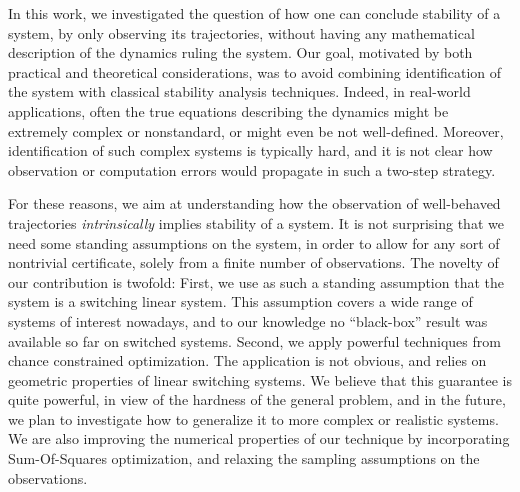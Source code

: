 In this work, we investigated the question of how one can conclude stability of a system, by only observing its trajectories, without having any mathematical description of the dynamics ruling the system. Our goal, motivated by both practical and theoretical considerations, was to avoid combining identification of the system with classical stability analysis techniques. Indeed, in real-world applications, often the true equations describing the dynamics might be extremely complex or nonstandard, or might even be not well-defined. Moreover, identification of such complex systems is typically hard, and it is not clear how observation or computation errors would propagate in such a two-step strategy. 

For these reasons, we aim at understanding how the observation of well-behaved trajectories \emph{intrinsically} implies stability of a system. It is not surprising that we need some standing assumptions on the system, in order to allow for any sort of nontrivial certificate, solely from a finite number of observations. The novelty of our contribution is twofold: 
First, we use as such a standing assumption that the system is a switching linear system. This assumption covers a wide range of systems of interest nowadays, and to our knowledge no ``black-box'' result was available so far on switched systems.  
Second, we apply powerful techniques from chance constrained optimization. The application is not obvious, and relies on geometric properties of linear switching systems. We believe that this guarantee is quite powerful, in view of the hardness of the general problem, and in the future, we plan to investigate how to generalize it to more complex or realistic systems. We are also improving the numerical properties of our technique by incorporating Sum-Of-Squares optimization, and relaxing the sampling assumptions on the observations.
